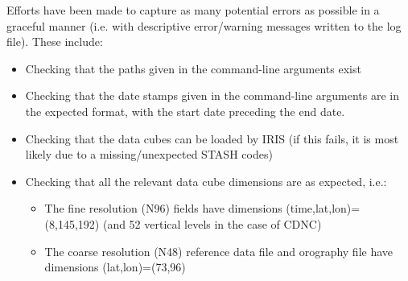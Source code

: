 \documentclass[10pt,a4paper]{article}
\begin{document}
Efforts have been made to capture as many potential errors as possible in a graceful manner (i.e. with descriptive error/warning messages written to the log file). These include:
\begin{itemize}
\item Checking that the paths given in the command-line arguments exist
\item Checking that the date stamps given in the command-line arguments are in the expected format, with the start date preceding the end date.
\item Checking that the data cubes can be loaded by IRIS (if this fails, it is most likely due to a missing/unexpected STASH codes)
\item Checking that all the relevant data cube dimensions are as expected, i.e.:
\begin{itemize}
\item The fine resolution (N96) fields have dimensions (time,lat,lon)=(8,145,192) (and 52 vertical levels in the case of CDNC)
\item The coarse resolution (N48) reference data file and orography file have dimensions (lat,lon)=(73,96)
\end{itemize}
\end{itemize}
\end{document}

